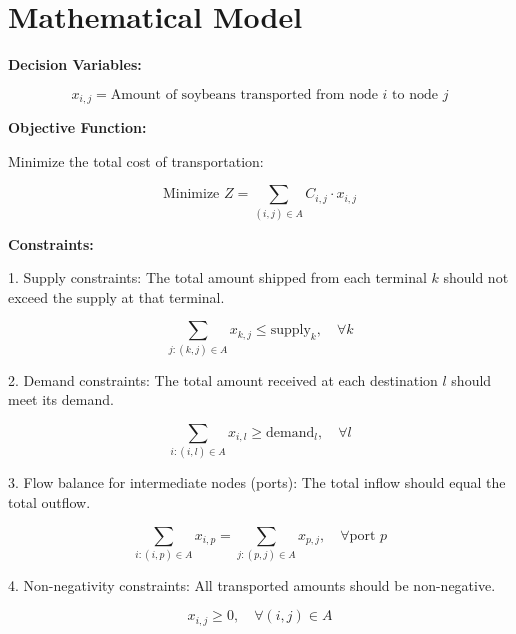 \documentclass{article}
\begin{document}
\section*{Mathematical Model}

\textbf{Decision Variables:}

\[
x_{i,j} = \text{Amount of soybeans transported from node } i \text{ to node } j
\]

\textbf{Objective Function:}

Minimize the total cost of transportation:

\[
\text{Minimize } Z = \sum_{(i,j) \in A} C_{i,j} \cdot x_{i,j}
\]

\textbf{Constraints:}

1. Supply constraints: The total amount shipped from each terminal \(k\) should not exceed the supply at that terminal.

\[
\sum_{j : (k,j) \in A} x_{k,j} \leq \text{supply}_k, \quad \forall k
\]

2. Demand constraints: The total amount received at each destination \(l\) should meet its demand.

\[
\sum_{i : (i,l) \in A} x_{i,l} \geq \text{demand}_l, \quad \forall l
\]

3. Flow balance for intermediate nodes (ports): The total inflow should equal the total outflow.

\[
\sum_{i : (i,p) \in A} x_{i,p} = \sum_{j : (p,j) \in A} x_{p,j}, \quad \forall \text{port } p
\]

4. Non-negativity constraints: All transported amounts should be non-negative.

\[
x_{i,j} \geq 0, \quad \forall (i,j) \in A
\]
\end{document}
